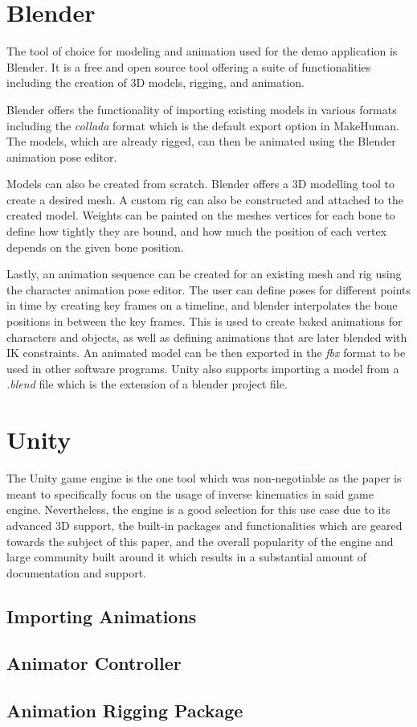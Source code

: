 \section{Blender}
The tool of choice for modeling and animation used for the demo application is
Blender. It is a free and open source tool offering a suite of functionalities
including the creation of 3D models, rigging, and animation. 


Blender offers the functionality of importing existing models in various formats
including the \textit{collada} format \cite{collada} which is the default export
option in MakeHuman. The models, which are already rigged, can then be animated
using the Blender animation pose editor. 

Models can also be created from scratch. Blender offers a 3D modelling tool to
create a desired mesh. A custom rig can also be constructed and attached to the
created model. Weights can be painted on the meshes vertices for each bone to
define how tightly they are bound, and how much the position of each vertex
depends on the given bone position. 

Lastly, an animation sequence can be created for an existing mesh and rig using
the character animation pose editor. The user can define poses for different
points in time by creating key frames on a timeline, and blender interpolates the
bone positions in between the key frames. This is used to create baked animations
for characters and objects, as well as defining animations that are later
blended with IK constraints. An animated model can be then exported in the
\textit{fbx} format to be used in other software programs. Unity also supports
importing a model from a \textit{.blend} file which is the extension of
a blender project file. 


\section{Unity}
The Unity game engine is the one tool which was non-negotiable as the paper
is meant to specifically focus on the usage of inverse kinematics in said game
engine. Nevertheless, the engine is a good selection for this use case due to
its advanced 3D support, the built-in packages and functionalities which are
geared towards the subject of this paper, and the overall popularity of the
engine and large community built around it which results in a substantial amount
of documentation and support. 

\subsection{Importing Animations}

\subsection{Animator Controller}

\subsection{Animation Rigging Package}
